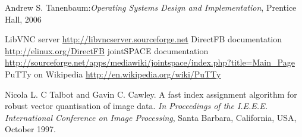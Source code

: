 \renewcommand{\bibname}{References}
\bibintoc %
\begin{thebibliography}{20}
 Andrew S. Tanenbaum:\emph{Operating Systems Design and Implementation}, Prentice Hall, 2006

LibVNC server \url{http://libvncserver.sourceforge.net}
DirectFB documentation \url{http://elinux.org/DirectFB}
jointSPACE documentation \url{http://sourceforge.net/apps/mediawiki/jointspace/index.php?title=Main_Page}
PuTTy on Wikipedia \url{http://en.wikipedia.org/wiki/PuTTy}

 Nicola L. C Talbot and Gavin C. Cawley. A fast index assignment algorithm for robust vector quantisation of image data. \emph{In Proceedings of the I.E.E.E. International Conference on Image Processing}, Santa Barbara, California, USA,  October 1997.

\end{thebibliography}

